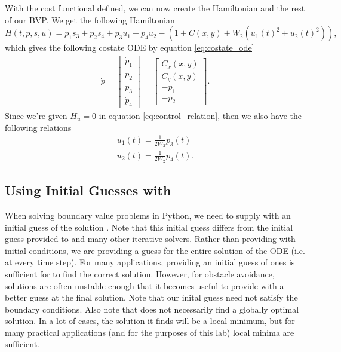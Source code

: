 With the cost functional defined, we can now create the Hamiltonian and the rest of our BVP.
We get the following Hamiltonian
\begin{equation}\label{eq:ex-Hamiltonian}
    H(t,p,s,u) = p_1s_3 + p_2s_4 + p_3u_1 + p_4u_2 - \left(1 + C(x,y) + W_2\left(u_1(t)^2+u_2(t)^2\right) \right),
\end{equation}
which gives the following costate ODE by equation \ref{eq:costate_ode}
\begin{equation}\label{eq:ex-costate-odes}
    \begin{aligned}
        \dot{p} =
        \begin{bmatrix}
            \dot{p}_1 \\
            \dot{p}_2 \\
            \dot{p}_3 \\
            \dot{p}_4
        \end{bmatrix} =
        \begin{bmatrix}
            C_x(x,y) \\
            C_y(x,y) \\
            -p_1 \\
            -p_2
        \end{bmatrix}.
    \end{aligned}
\end{equation}
Since we're given $H_u = 0$ in equation \ref{eq:control_relation}, then we also have the following relations
\begin{equation}\label{eq:ex-equality-constraints}
    \begin{aligned}
    u_1(t) = \frac{1}{2W_2}p_3(t) \\
    u_2(t) = \frac{1}{2W_2}p_4(t).
    \end{aligned}
\end{equation}

\subsection*{Using Initial Guesses with }
When solving boundary value problems in Python, we need to supply  with an initial guess  of the solution .
Note that this initial guess  differs from the initial guess provided to  and many other iterative solvers.
Rather than providing  with initial conditions, we are providing a guess for the entire solution of the ODE (i.e. at every time step).
For many applications, providing an initial guess of ones is sufficient for  to find the correct solution.
However, for obstacle avoidance, solutions are often unstable enough that it becomes useful to provide  with a better guess at the final solution.
Note that our inital guess need not satisfy the boundary conditions.
Also note that  does not necessarily find a globally optimal solution.
In a lot of cases, the solution it finds will be a local minimum, but for many practical applications (and for the purposes of this lab) local minima are sufficient.

